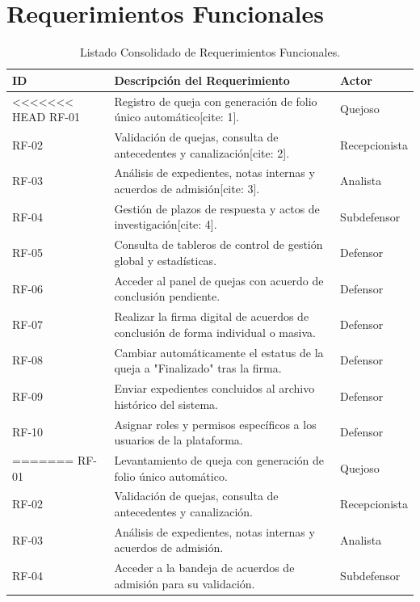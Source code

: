 \section{Requerimientos Funcionales}
\begin{table}[h!]
\centering
\small
\caption{Listado Consolidado de Requerimientos Funcionales.}
\label{tab:func_req}
\begin{tabular}{@{} l p{9.5cm} l @{}}
\toprule
\rowcolor[HTML]{2D3E50} 
\textbf{\color[HTML]{FFFFFF} ID} & \textbf{\color[HTML]{FFFFFF} Descripción del Requerimiento} & \textbf{\color[HTML]{FFFFFF} Actor} \\ \midrule
\rowcolor[HTML]{F2F4F7} 
<<<<<<< HEAD
RF-01 & Registro de queja con generación de folio único automático[cite: 1]. & Quejoso \\
RF-02 & Validación de quejas, consulta de antecedentes y canalización[cite: 2]. & Recepcionista \\
\rowcolor[HTML]{F2F4F7} 
RF-03 & Análisis de expedientes, notas internas y acuerdos de admisión[cite: 3]. & Analista \\
RF-04 & Gestión de plazos de respuesta y actos de investigación[cite: 4]. & Subdefensor \\
\rowcolor[HTML]{F2F4F7} 
RF-05 & Consulta de tableros de control de gestión global y estadísticas. & Defensor \\
RF-06 & Acceder al panel de quejas con acuerdo de conclusión pendiente. & Defensor \\
\rowcolor[HTML]{F2F4F7} 
RF-07 & Realizar la firma digital de acuerdos de conclusión de forma individual o masiva. & Defensor \\
RF-08 & Cambiar automáticamente el estatus de la queja a "Finalizado" tras la firma. & Defensor \\
\rowcolor[HTML]{F2F4F7} 
RF-09 & Enviar expedientes concluidos al archivo histórico del sistema. & Defensor \\
RF-10 & Asignar roles y permisos específicos a los usuarios de la plataforma. & Defensor \\ \bottomrule
=======
RF-01 & Levantamiento de queja con generación de folio único automático. & Quejoso \\
RF-02 & Validación de quejas, consulta de antecedentes y canalización. & Recepcionista \\
\rowcolor[HTML]{F2F4F7} 
RF-03 & Análisis de expedientes, notas internas y acuerdos de admisión. & Analista \\
RF-04 & Acceder a la bandeja de acuerdos de admisión para su validación. & Subdefensor \\

\end{tabular}
\end{table}

